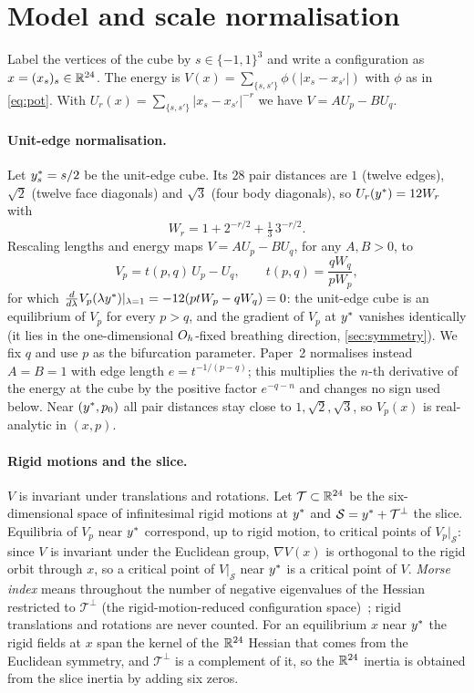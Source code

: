 \section{Model and scale normalisation}\label{sec:model}

Label the vertices of the cube by $s\in\{-1,1\}^3$ and write a configuration as $x=(x_s)_s\in\mathbb{R}^{24}$. The energy is
$V(x)=\sum_{\{s,s'\}}\phi(|x_s-x_{s'}|)$ with $\phi$ as in \eqref{eq:pot}. With $U_r(x)=\sum_{\{s,s'\}}|x_s-x_{s'}|^{-r}$
we have $V=AU_p-BU_q$.

\paragraph{Unit-edge normalisation.} Let $y^{*}_s=s/2$ be the unit-edge cube. Its $28$ pair distances are $1$
(twelve edges), $\sqrt2$ (twelve face diagonals) and $\sqrt3$ (four body diagonals), so $U_r(y^{*})=12W_r$ with
\begin{equation}\label{eq:W}
W_r=1+2^{-r/2}+\tfrac13\,3^{-r/2}.
\end{equation}
Rescaling lengths and energy maps $V=AU_p-BU_q$, for any $A,B>0$, to
\begin{equation}\label{eq:Vp}
V_p=t(p,q)\,U_p-U_q,\qquad t(p,q)=\frac{qW_q}{pW_p},
\end{equation}
for which $\frac{d}{d\lambda}V_p(\lambda y^{*})|_{\lambda=1}=-12(ptW_p-qW_q)=0$: the unit-edge cube is an equilibrium of
$V_p$ for every $p>q$, and the gradient of $V_p$ at $y^{*}$ vanishes identically (it lies in the one-dimensional
$O_{h}$-fixed breathing direction, \cref{sec:symmetry}). We fix $q$ and use $p$ as the bifurcation parameter. Paper~2
normalises instead $A=B=1$ with edge length $e=t^{-1/(p-q)}$; this multiplies the $n$-th derivative of the energy at
the cube by the positive factor $e^{-q-n}$ and changes no sign used below. Near $(y^{*},p_0)$ all pair distances
stay close to $1,\sqrt2,\sqrt3$, so $V_p(x)$ is real-analytic in $(x,p)$.

\paragraph{Rigid motions and the slice.} $V$ is invariant under translations and rotations. Let $\mathcal T\subset\mathbb{R}^{24}$
be the six-dimensional space of infinitesimal rigid motions at $y^{*}$ and $\mathcal S=y^{*}+\mathcal T^{\perp}$ the
slice. Equilibria of $V_p$ near $y^{*}$ correspond, up to rigid motion, to critical points of $V_p|_{\mathcal S}$: since
$V$ is invariant under the Euclidean group, $\nabla V(x)$ is orthogonal to the rigid orbit through $x$, so a critical
point of $V|_{\mathcal S}$ near $y^{*}$ is a critical point of $V$. \emph{Morse index} means throughout the number of
negative eigenvalues of the Hessian restricted to $\mathcal T^\perp$ (the rigid-motion-reduced configuration space)~\citep{Milnor1963};
rigid translations and rotations are never counted. For an equilibrium $x$ near $y^{*}$ the rigid fields at $x$ span
the kernel of the $\mathbb{R}^{24}$ Hessian that comes from the Euclidean symmetry, and $\mathcal T^\perp$ is a complement of it,
so the $\mathbb{R}^{24}$ inertia is obtained from the slice inertia by adding six zeros.

